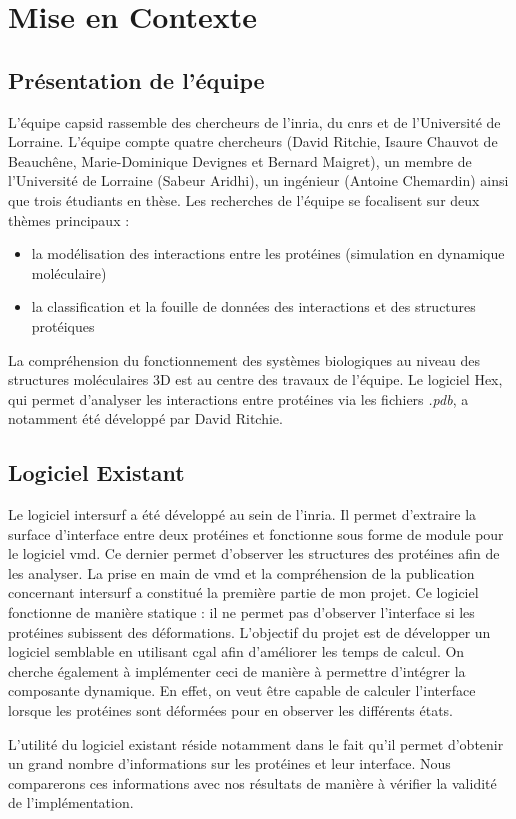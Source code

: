 \chapter{Mise en Contexte}

\section{Présentation de l'équipe}

L'équipe \gls{capsid} rassemble des chercheurs de l'\gls{inria}, du \gls{cnrs}
et de l'Université de Lorraine. L'équipe compte quatre
chercheurs (David Ritchie, Isaure Chauvot de Beauchêne, Marie-Dominique Devignes et
Bernard Maigret), un membre de l'Université de Lorraine (Sabeur Aridhi), un ingénieur
(Antoine Chemardin) ainsi que trois étudiants en thèse.
Les recherches de l'équipe se focalisent sur deux thèmes principaux :
\begin{itemize}
  \item la modélisation des interactions entre les protéines (simulation en dynamique
  moléculaire)
  \item la classification et la fouille de données des interactions et des structures
  protéiques
\end{itemize}
La compréhension du fonctionnement des systèmes biologiques au niveau des structures
moléculaires 3D est au centre des travaux de l'équipe.
Le logiciel Hex, qui permet d'analyser les interactions entre protéines via les fichiers
\textit{.pdb}, a notamment été développé par David Ritchie.

\section{Logiciel Existant}

Le logiciel \gls{intersurf} \cite{intersurf} a été développé au sein de l'\gls{inria}.
Il permet d'extraire la surface d'interface entre deux protéines et fonctionne sous forme
de module pour le logiciel \gls{vmd}. Ce dernier permet d'observer les
structures des protéines afin de les analyser. La prise en main de \gls{vmd} et la compréhension de
la publication concernant \gls{intersurf} a constitué la première partie de mon projet.
Ce logiciel fonctionne de manière statique : il ne permet pas d'observer l'interface
si les protéines subissent des déformations.
L'objectif du projet est de développer un logiciel semblable en utilisant \gls{cgal}
afin d'améliorer les temps de calcul. On cherche également à implémenter ceci de manière à permettre
d'intégrer la composante dynamique. En effet, on veut être capable de calculer l'interface
lorsque les protéines sont déformées pour en observer les différents états.

L'utilité du logiciel existant réside notamment dans le fait qu'il permet d'obtenir
un grand nombre d'informations sur les protéines et leur interface. Nous comparerons ces informations
avec nos résultats de manière à vérifier la validité de l'implémentation.
